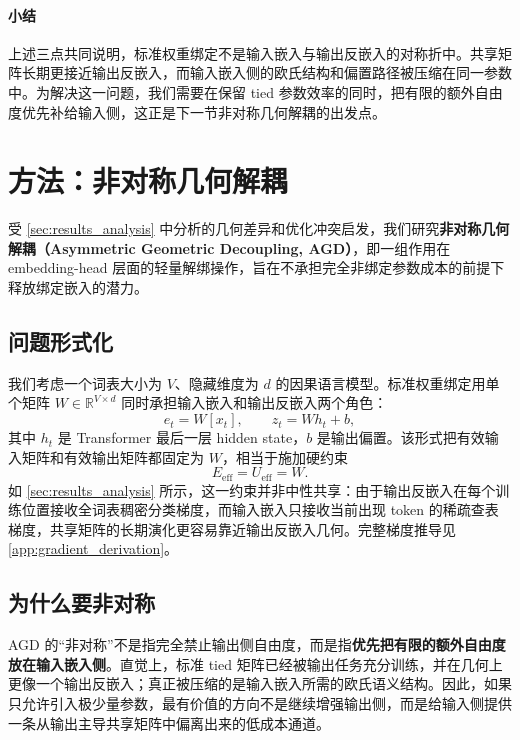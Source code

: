 \documentclass{article}
\theoremstyle{plain}
\theoremstyle{definition}
\theoremstyle{remark}
\begin{document}
\paragraph{小结}
上述三点共同说明，标准权重绑定不是输入嵌入与输出反嵌入的对称折中。共享矩阵长期更接近输出反嵌入，而输入嵌入侧的欧氏结构和偏置路径被压缩在同一参数中。为解决这一问题，我们需要在保留 tied 参数效率的同时，把有限的额外自由度优先补给输入侧，这正是下一节非对称几何解耦的出发点。



\section{方法：非对称几何解耦}
\label{sec:method}

受 \cref{sec:results_analysis} 中分析的几何差异和优化冲突启发，我们研究\textbf{非对称几何解耦（Asymmetric Geometric Decoupling, AGD）}，即一组作用在 embedding-head 层面的轻量解绑操作，旨在不承担完全非绑定参数成本的前提下释放绑定嵌入的潜力。

\subsection{问题形式化}
我们考虑一个词表大小为 $V$、隐藏维度为 $d$ 的因果语言模型。标准权重绑定用单个矩阵 $W\in\mathbb{R}^{V\times d}$ 同时承担输入嵌入和输出反嵌入两个角色：
\begin{equation}
    e_t = W[x_t],\qquad z_t = W h_t + b ,
\end{equation}
其中 $h_t$ 是 Transformer 最后一层 hidden state，$b$ 是输出偏置。该形式把有效输入矩阵和有效输出矩阵都固定为 $W$，相当于施加硬约束
\begin{equation}
    E_{\mathrm{eff}} = U_{\mathrm{eff}} = W .
\end{equation}
如 \cref{sec:results_analysis} 所示，这一约束并非中性共享：由于输出反嵌入在每个训练位置接收全词表稠密分类梯度，而输入嵌入只接收当前出现 token 的稀疏查表梯度，共享矩阵的长期演化更容易靠近输出反嵌入几何。完整梯度推导见 \cref{app:gradient_derivation}。

\subsection{为什么要非对称}

AGD 的“非对称”不是指完全禁止输出侧自由度，而是指\textbf{优先把有限的额外自由度放在输入嵌入侧}。直觉上，标准 tied 矩阵已经被输出任务充分训练，并在几何上更像一个输出反嵌入；真正被压缩的是输入嵌入所需的欧氏语义结构。因此，如果只允许引入极少量参数，最有价值的方向不是继续增强输出侧，而是给输入侧提供一条从输出主导共享矩阵中偏离出来的低成本通道。
\end{document}

